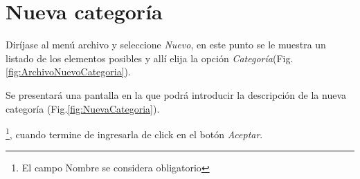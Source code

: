 \section{Nueva categor\'ia}
\label{sec:nuevaCategoria}
Dir\'ijase al men\'u archivo y seleccione \emph{Nuevo}, en este punto se le muestra un listado de los elementos posibles y
all\'i elija la opci\'on \emph{Categor\'ia}(Fig.\ref{fig:ArchivoNuevoCategoria}). 
  

Se presentar\'a una pantalla en la que podr\'a introducir la descripci\'on de la
nueva categor\'ia (Fig.\ref{fig:NuevaCategoria}). 
  
\footnote{El campo Nombre se considera obligatorio},
cuando termine de ingresarla de click en el bot\'on \emph{Aceptar}.